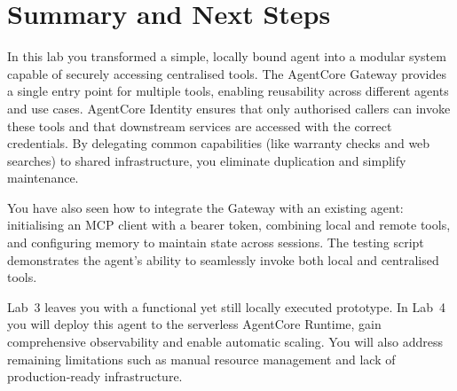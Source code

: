\section{Summary and Next Steps}

In this lab you transformed a simple, locally bound agent into a modular
system capable of securely accessing centralised tools.  The AgentCore
Gateway provides a single entry point for multiple tools, enabling
reusability across different agents and use cases.  AgentCore Identity
ensures that only authorised callers can invoke these tools and that
downstream services are accessed with the correct credentials.  By
delegating common capabilities (like warranty checks and web searches) to
shared infrastructure, you eliminate duplication and simplify maintenance.

You have also seen how to integrate the Gateway with an existing agent:
initialising an MCP client with a bearer token, combining local and
remote tools, and configuring memory to maintain state across sessions.
The testing script demonstrates the agent’s ability to seamlessly invoke
both local and centralised tools.

Lab 3 leaves you with a functional yet still locally executed prototype.
In Lab 4 you will deploy this agent to the serverless AgentCore Runtime,
gain comprehensive observability and enable automatic scaling.  You will
also address remaining limitations such as manual resource management and
lack of production‑ready infrastructure.

